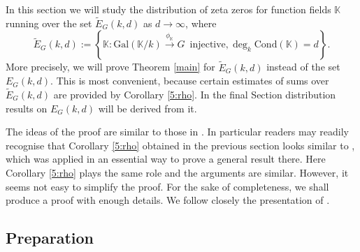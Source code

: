\documentclass[12pt]{amsart}
\theoremstyle{plain}
\begin{document}
In this section we will study the distribution of zeta zeros for function fields ${{\mathbb K}}$ running over the set $\widetilde{E}_G(k,d)$ as $d \to \infty$, where
\[\widetilde{E}_G(k,d):= \left\{{{\mathbb K}}: \mathrm{Gal}({{\mathbb K}}/k) \overset{\phi_{{\mathbb K}}}{\longrightarrow} G \, \mbox{ injective}, \deg_k \mathrm{Cond}({{\mathbb K}})=d\right\}. \]
More precisely, we will prove Theorem \ref{main} for $\widetilde{E}_G(k,d)$ instead of the set $E_G(k,d)$. This is most convenient, because certain estimates of sums over $\widetilde{E}_G(k,d)$ are provided by Corollary \ref{5:rho}. In the final Section distribution results on $E_G(k,d)$ will be derived from it.

The ideas of the proof are similar to those in \cite{fai,buc3, xio}. In particular readers may readily recognise that Corollary \ref{5:rho} obtained in the previous section looks similar to \cite[Theorem 2]{xio}, which was applied in an essential way to prove a general result there. Here Corollary \ref{5:rho} plays the same role and the arguments are similar. However, it seems not easy to simplify the proof. For the sake of completeness, we shall produce a proof with enough details. We follow closely the presentation of \cite[Section 3]{xio}.

\subsection{Preparation}
\end{document}
